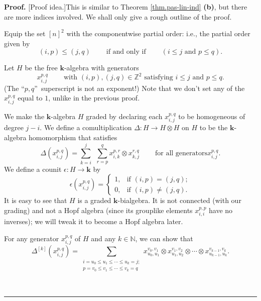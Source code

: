 \documentclass[numbers=enddot,12pt,final,onecolumn,notitlepage]{scrartcl}%
\theoremstyle{definition}
\newenvironment{proof}[1][Proof]{\noindent\textbf{#1.} }{\ \rule{0.5em}{0.5em}}
\let\sumnonlimits\sum
\renewcommand{\sum}{\sumnonlimits\limits}
\newenvironment{noncompile}{}{}
\begin{document}
\begin{proof}
[Proof idea.]This is similar to Theorem \ref{thm.pas-lin-ind} \textbf{(b)},
but there are more indices involved. We shall only give a rough outline of the proof.

\begin{noncompile}
Equip the set $\left[  n\right]  ^{2}$ with the componentwise partial order:
i.e., the partial order given by%
\[
\left(  i,p\right)  \leq\left(  j,q\right)  \ \ \ \ \ \ \ \ \ \ \text{if and
only if}\ \ \ \ \ \ \ \ \ \ \left(  i\leq j\text{ and }p\leq q\right)  .
\]

\end{noncompile}

Let $H$ be the free $\mathbf{k}$-algebra with generators
\[
x_{i,j}^{p,q}\ \ \ \ \ \ \ \ \ \ \text{with }\left(  i,p\right)  ,\left(
j,q\right)  \in\mathbb{Z}^{2}\text{ satisfying }i\leq j\text{ and }p\leq q.
\]
(The \textquotedblleft$p,q$\textquotedblright\ superscript is not an
exponent!) Note that we don't set any of the $x_{i,j}^{p,q}$ equal to $1$,
unlike in the previous proof.

We make the $\mathbf{k}$-algebra $H$ graded by declaring each $x_{i,j}^{p,q}$
to be homogeneous of degree $j-i$. We define a comultiplication $\Delta
:H\rightarrow H\otimes H$ on $H$ to be the $\mathbf{k}$-algebra homomorphism
that satisfies%
\[
\Delta\left(  x_{i,j}^{p,q}\right)  =\sum_{k=i}^{j}\ \ \sum_{r=p}^{q}%
x_{i,k}^{p,r}\otimes x_{k,j}^{r,q}\ \ \ \ \ \ \ \ \ \ \text{for all generators
}x_{i,j}^{p,q}.
\]
We define a counit $\epsilon:H\rightarrow\mathbf{k}$ by%
\[
\epsilon\left(  x_{i,j}^{p,q}\right)  =%
\begin{cases}
1, & \text{if }\left(  i,p\right)  =\left(  j,q\right)  ;\\
0, & \text{if }\left(  i,p\right)  \neq\left(  j,q\right)  .
\end{cases}
\]
It is easy to see that $H$ is a graded $\mathbf{k}$-bialgebra. It is not
connected (with our grading) and not a Hopf algebra (since its grouplike
elements $x_{i,i}^{p,p}$ have no inverses); we will tweak it to become a Hopf
algebra later.

For any generator $x_{i,j}^{p,q}$ of $H$ and any $k\in\mathbb{N}$, we can show
that%
\[
\Delta^{\left[  k\right]  }\left(  x_{i,j}^{p,q}\right)  =\sum
_{\substack{i=u_{0}\leq u_{1}\leq\cdots\leq u_{k}=j;\\p=v_{0}\leq v_{1}%
\leq\cdots\leq v_{k}=q}}x_{u_{0},u_{1}}^{v_{0},v_{1}}\otimes x_{u_{1},u_{2}%
}^{v_{1},v_{2}}\otimes\cdots\otimes x_{u_{k-1},u_{k}}^{v_{k-1},v_{k}}.
\]



\end{proof}
\end{document}
